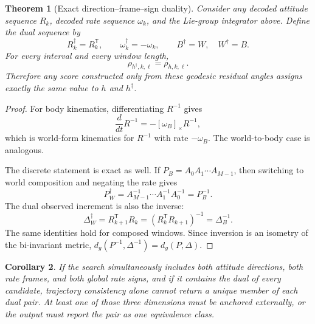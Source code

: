 \documentclass[11pt]{article}
\newtheorem{theorem}{Theorem}
\newtheorem{corollary}[theorem]{Corollary}
\newcommand{\T}{\mathsf{T}}
\begin{document}
    \begin{theorem}[Exact direction--frame--sign duality]\label{thm:direction-frame-sign}
        Consider any decoded attitude sequence $R_k$, decoded rate sequence $\omega_k$, and the
        Lie-group integrator above. Define the dual sequence by
        \begin{equation}
            R_k^\dagger=R_k^{\T},
            \qquad
            \omega_k^\dagger=-\omega_k,
            \qquad
            B^\dagger=W,
            \quad W^\dagger=B.
        \end{equation}
        For every interval and every window length,
        \begin{equation}
            \rho_{h^\dagger,k,\ell}=\rho_{h,k,\ell}.
        \end{equation}
        Therefore any score constructed only from these geodesic residual angles assigns
        exactly the same value to $h$ and $h^\dagger$.
    \end{theorem}

    \begin{proof}
        For body kinematics, differentiating $R^{-1}$ gives
        \begin{equation}
            \frac{d}{dt}R^{-1}=-[\omega_B]_\times R^{-1},
        \end{equation}
        which is world-form kinematics for $R^{-1}$ with rate $-\omega_B$. The world-to-body
        case is analogous.

        The discrete statement is exact as well. If
        $P_B=A_0A_1\cdots A_{M-1}$, then switching to world composition and negating the rate
        gives
        \begin{equation}
            P_W^\dagger=A_{M-1}^{-1}\cdots A_1^{-1}A_0^{-1}=P_B^{-1}.
        \end{equation}
        The dual observed increment is also the inverse:
        \begin{equation}
            \Delta_W^\dagger
            =R_{k+1}^{\T} R_k
            =(R_k^{\T} R_{k+1})^{-1}=\Delta_B^{-1}.
        \end{equation}
        The same identities hold for composed windows. Since inversion is an isometry of the
        bi-invariant metric,
        $d_g(P^{-1},\Delta^{-1})=d_g(P,\Delta)$.
    \end{proof}

    \begin{corollary}
        If the search simultaneously includes both attitude directions, both rate frames, and
        both global rate signs, and if it contains the dual of every candidate, trajectory
        consistency alone cannot return a unique member of each dual pair. At least one of those
        three dimensions must be anchored externally, or the output must report the pair as one
        equivalence class.
    \end{corollary}
\end{document}
